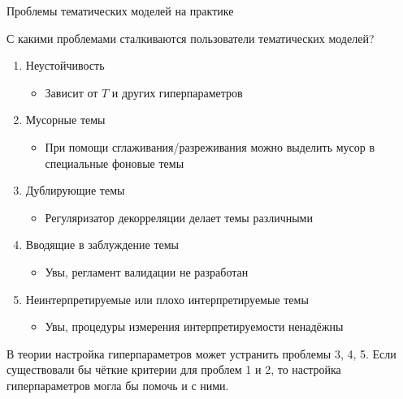 \begin{frame}[t]{Проблемы тематических моделей на практике}

С какими проблемами сталкиваются пользователи тематических моделей?
\begin{enumerate}
    \item{ Неустойчивость \begin{itemize}
        \item {Зависит от $T$ и других гиперпараметров}
    \end{itemize}}
    \item{ Мусорные темы \begin{itemize}
        \item {При помощи сглаживания/разреживания можно выделить мусор в специальные фоновые темы}
    \end{itemize}}
    \item{ Дублирующие темы \begin{itemize}
        \item {Регуляризатор декорреляции делает темы различными}
    \end{itemize}}
    \item{ Вводящие в заблуждение темы \begin{itemize}
        \item {Увы, регламент валидации не разработан}
    \end{itemize}}
    \item{ Неинтерпретируемые или плохо интерпретируемые темы \begin{itemize}
        \item {Увы, процедуры измерения интерпретируемости ненадёжны}
    \end{itemize}}
\end{enumerate}
В теории настройка гиперпараметров может устранить проблемы 3, 4, 5. Если существовали бы чёткие критерии для проблем 1 и 2,  то настройка гиперпараметров могла бы помочь и с ними.
\end{frame}



